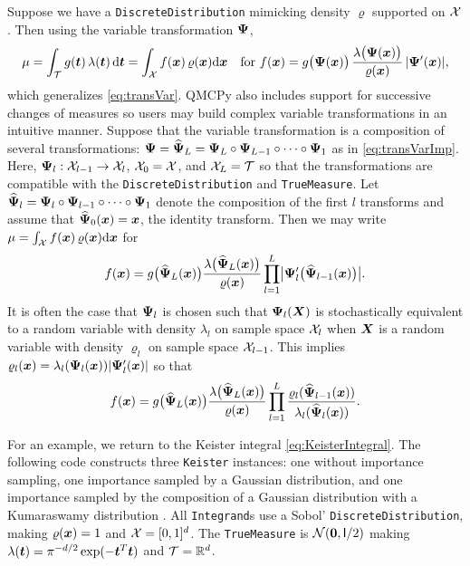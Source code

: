 \documentclass[graybox,footinfo]{svmult}
\newcommand{\mI}{\mathsf{I}}
\begin{document}
Suppose we have a \texttt{DiscreteDistribution} mimicking  density $\varrho$ supported on ${\mathcal{X}}$.  Then using the variable transformation ${\boldsymbol{\Psi}}$, 
\begin{equation*}
	\mu = \int_{\mathcal{T}} g({\boldsymbol{t}}) \, \lambda({\boldsymbol{t}}) \, \mathrm{d} {\boldsymbol{t}}  =  \int_{{\mathcal{X}}}f({\boldsymbol{x}}) \, \varrho({\boldsymbol{x}}) \mathrm{d} {\boldsymbol{x}} \quad \text{for }
   f({\boldsymbol{x}})  = g\bigl({\boldsymbol{\Psi}}({\boldsymbol{x}})\bigr)  \, \frac{\lambda\bigl({\boldsymbol{\Psi}}({\boldsymbol{x}})\bigr)}{\varrho({\boldsymbol{x}})} \, \lvert {\boldsymbol{\Psi}}'({\boldsymbol{x}})\rvert,
\end{equation*}
which generalizes \eqref{eq:transVar}.
QMCPy also includes support for successive changes of measures so users may build complex variable transformations in an intuitive manner. Suppose that the variable transformation is a composition of several transformations: ${\boldsymbol{\Psi}}=\widehat{{\boldsymbol{\Psi}}}_L = {\boldsymbol{\Psi}}_L \circ {\boldsymbol{\Psi}}_{L-1} \circ \dots \circ {\boldsymbol{\Psi}}_1$ as in \eqref{eq:transVarImp}. Here, ${\boldsymbol{\Psi}}_l:{\mathcal{X}}_{l-1} \to {\mathcal{X}}_l$,  ${\mathcal{X}}_0={\mathcal{X}}$, and ${\mathcal{X}}_L={\mathcal{T}}$ so that the transformations are compatible with the \texttt{DiscreteDistribution} and \texttt{TrueMeasure}. Let $\widehat{{\boldsymbol{\Psi}}}_l={\boldsymbol{\Psi}}_l \circ {\boldsymbol{\Psi}}_{l-1} \circ \dots \circ {\boldsymbol{\Psi}}_1$ denote the composition of the first $l$ transforms and assume that $\widehat{{\boldsymbol{\Psi}}}_0({\boldsymbol{x}})={\boldsymbol{x}}$, the identity transform. Then we may write $\mu =  \int_{{\mathcal{X}}}f({\boldsymbol{x}}) \, \varrho({\boldsymbol{x}}) \mathrm{d} {\boldsymbol{x}}$ for 
\begin{equation*}
    f({\boldsymbol{x}}) 
 = g\bigl(\widehat{{\boldsymbol{\Psi}}}_L({\boldsymbol{x}})\bigr)\frac{\lambda\bigl(\widehat{{\boldsymbol{\Psi}}}_L({\boldsymbol{x}})\bigr)}{\varrho({\boldsymbol{x}})}\prod_{l=1}^L \bigl\lvert {\boldsymbol{\Psi}}_l'\bigl(\widehat{{\boldsymbol{\Psi}}}_{l-1}({\boldsymbol{x}})\bigr) \bigr\rvert .
\end{equation*}
It is often the case that ${\boldsymbol{\Psi}}_l$ is chosen such that ${\boldsymbol{\Psi}}_l({\boldsymbol{X}})$ is stochastically equivalent to a random variable with density $\lambda_l$ on sample space ${\mathcal{X}}_l$ when ${\boldsymbol{X}}$ is a random variable with density $\varrho_l$ on sample space ${\mathcal{X}}_{l-1}$.  This implies  $\varrho_l({\boldsymbol{x}}) = \lambda_l({\boldsymbol{\Psi}}_l({\boldsymbol{x}}))\lvert  {\boldsymbol{\Psi}}'_l ({\boldsymbol{x}}) \rvert$ so that
\begin{equation*}
f({\boldsymbol{x}}) 
 = g\bigl(\widehat{{\boldsymbol{\Psi}}}_L({\boldsymbol{x}})\bigr)\frac{\lambda\bigl(\widehat{{\boldsymbol{\Psi}}}_L({\boldsymbol{x}})\bigr)}{\varrho({\boldsymbol{x}})}\prod_{l=1}^L \frac{\varrho_l(\widehat{{\boldsymbol{\Psi}}}_{l-1}({\boldsymbol{x}}))}{\lambda_l(\widehat{{\boldsymbol{\Psi}}}_l({\boldsymbol{x}}))} .
\end{equation*}

For an example, we return to the Keister integral \eqref{eq:KeisterIntegral}. The following code constructs three \texttt{Keister} instances: one without importance sampling, one importance sampled by a Gaussian distribution, and one importance sampled by the composition of a Gaussian distribution with a Kumaraswamy distribution \cite{Kumaraswamy}. All \texttt{Integrand}s use a Sobol' \texttt{DiscreteDistribution}, making $\varrho({\boldsymbol{x}})=1$ and ${\mathcal{X}} = [0,1]^d$. The \texttt{TrueMeasure} is $\calN(\bszero,\mI/2)$ making $\lambda({\boldsymbol{t}}) = \pi^{-d/2} \exp(-{\boldsymbol{t}}^T {\boldsymbol{t}})$ and ${\mathcal{T}} = {\mathbb{R}}^d$. 
\end{document}
